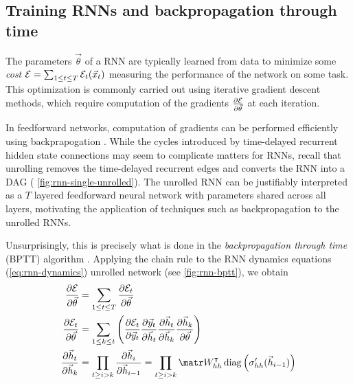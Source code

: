 \subsection{Training RNNs and backpropagation through time}


The parameters $\vec{\theta}$ of a RNN are typically learned from data to
minimize some \emph{cost} $\mathcal{E} = \sum_{1 \leq t \leq T} \mathcal{E}_t(\vec{x}_t)$
measuring the performance of the network on some task. This optimization is
commonly carried out using iterative gradient descent methods, which require
computation of the gradients $\frac{\partial \mathcal{E}}{\partial \vec{\theta}}$ at each
iteration.

In feedforward networks, computation of gradients can be performed efficiently
using backprapogation
\citep{bryson1963optimal,linnainmaa1970representation,rumelhart1988learning}.
While the cycles introduced by time-delayed recurrent hidden state connections
may seem to complicate matters for RNNs, recall that unrolling removes the
time-delayed recurrent edges and converts the RNN into a DAG (\eg
\vref{fig:rnn-single-unrolled}). The unrolled RNN can be justifiably
interpreted as a $T$ layered feedforward neural network with parameters shared
across all layers, motivating the application of techniques such as
backpropagation to the unrolled RNNs.

Unsurprisingly, this is precisely what is done in the \emph{backpropagation
through time} (BPTT) algorithm \citep{goller1996learning}. Applying the
chain rule to the RNN dynamics equations (\vref{eq:rnn-dynamics})
unrolled network (see \cref{fig:rnn-bptt}), we obtain
\begin{align}
  \frac{\pd \mathcal{E}}{\pd \vec{\theta}} &= \sum_{1 \leq t \leq T} \frac{\pd \mathcal{E}_t}{\pd \vec{\theta}} \label{eq:err-total}\\
    \frac{\pd \mathcal{E}_t}{\pd \vec{\theta}} &= \sum_{1 \leq k \leq t} \left(
        \frac{\pd \mathcal{E}_t}{\pd \y_t}
        \frac{\pd \y_t}{\pd \h_t}
        \frac{\pd \h_t}{\pd \h_k}
        \frac{\pd \h_k}{\pd \vec{\theta}}
    \right) \label{eq:error-t}\\
    \frac{\pd \h_t}{\pd \h_k} &=
    \prod_{t \geq i > k} \frac{\pd \h_i}{\pd \h_{i-1}}
    = \prod_{t \geq i > k} \W_{hh}^\tp \diag \left( \sigma_{hh}'( \h_{i-1} ) \right)
    \label{eq:error-transfer}
\end{align}

